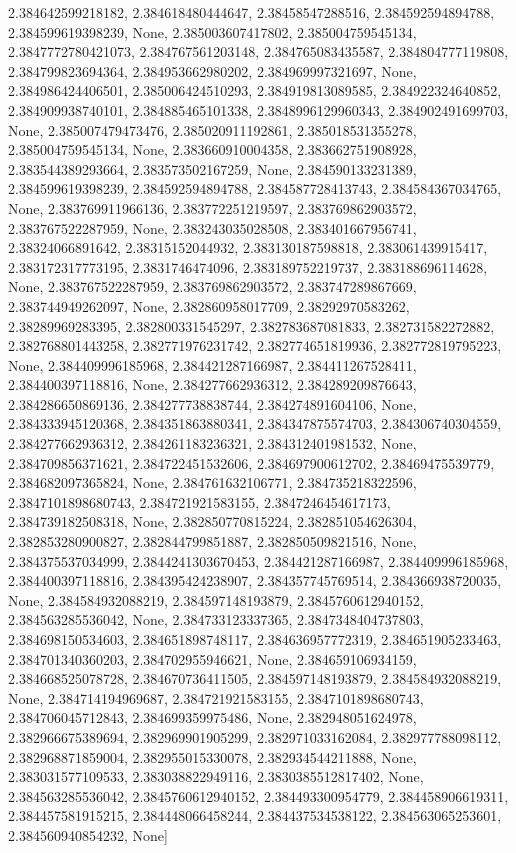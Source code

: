 \documentclass[
  11pt,
  french,
]{article}
\begin{document}
\begin{tcolorbox}[title= Répartition des volumes selon leurs caractéristiques ,colback=boitecode]
2.384642599218182, 2.384618480444647, 2.38458547288516, 2.384592594894788, 2.384599619398239, None, 2.385003607417802, 2.385004759545134, 2.3847772780421073, 2.384767561203148, 2.384765083435587, 2.384804777119808, 2.384799823694364, 2.384953662980202, 2.384969997321697, None, 2.384986424406501, 2.385006424510293, 2.384919813089585, 2.384922324640852, 2.384909938740101, 2.384885465101338, 2.3848996129960343, 2.384902491699703, None, 2.385007479473476, 2.385020911192861, 2.385018531355278, 2.385004759545134, None, 2.383660910004358, 2.383662751908928, 2.383544389293664, 2.383573502167259, None, 2.384590133231389, 2.384599619398239, 2.384592594894788, 2.384587728413743, 2.384584367034765, None, 2.383769911966136, 2.383772251219597, 2.383769862903572, 2.383767522287959, None, 2.383243035028508, 2.383401667956741, 2.38324066891642, 2.38315152044932, 2.383130187598818, 2.383061439915417, 2.383172317773195, 2.3831746474096, 2.383189752219737, 2.383188696114628, None, 2.383767522287959, 2.383769862903572, 2.383747289867669, 2.383744949262097, None, 2.382860958017709, 2.38292970583262, 2.38289969283395, 2.382800331545297, 2.382783687081833, 2.382731582272882, 2.382768801443258, 2.382771976231742, 2.382774651819936, 2.382772819795223, None, 2.384409996185968, 2.384421287166987, 2.384411267528411, 2.384400397118816, None, 2.384277662936312, 2.384289209876643, 2.384286650869136, 2.384277738838744, 2.384274891604106, None, 2.384333945120368, 2.384351863880341, 2.384347875574703, 2.384306740304559, 2.384277662936312, 2.384261183236321, 2.384312401981532, None, 2.384709856371621, 2.384722451532606, 2.384697900612702, 2.38469475539779, 2.384682097365824, None, 2.384761632106771, 2.384735218322596, 2.3847101898680743, 2.384721921583155, 2.3847246454617173, 2.384739182508318, None, 2.382850770815224, 2.382851054626304, 2.382853280900827, 2.382844799851887, 2.382850509821516, None, 2.384375537034999, 2.3844241303670453, 2.384421287166987, 2.384409996185968, 2.384400397118816, 2.384395424238907, 2.384357745769514, 2.384366938720035, None, 2.384584932088219, 2.384597148193879, 2.3845760612940152, 2.384563285536042, None, 2.384733123337365, 2.3847348404737803, 2.384698150534603, 2.384651898748117, 2.384636957772319, 2.384651905233463, 2.384701340360203, 2.384702955946621, None, 2.384659106934159, 2.384668525078728, 2.384670736411505, 2.384597148193879, 2.384584932088219, None, 2.384714194969687, 2.384721921583155, 2.3847101898680743, 2.384706045712843, 2.384699359975486, None, 2.382948051624978, 2.382966675389694, 2.382969901905299, 2.382971033162084, 2.382977788098112, 2.382968871859004, 2.382955015330078, 2.382934544211888, None, 2.383031577109533, 2.383038822949116, 2.3830385512817402, None, 2.384563285536042, 2.3845760612940152, 2.384493300954779, 2.384458906619311, 2.384457581915215, 2.384448066458244, 2.384437534538122, 2.384563065253601, 2.384560940854232, None]

\end{tcolorbox}
\end{document}
